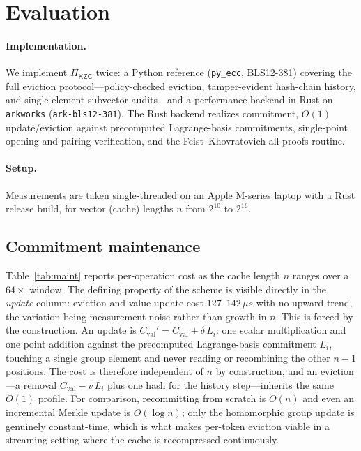 \documentclass[version=preprint]{iacrcc}
\theoremstyle{definition}
\newcommand{\Val}{\mathrm{val}}
\newcommand{\Cval}{C_{\Val}}
\begin{document}
\section{Evaluation}\label{sec:eval}

\paragraph{Implementation.}
We implement $\Pi_{\mathsf{KZG}}$ twice: a Python reference (\texttt{py\_ecc},
BLS12-381) covering the full eviction protocol---policy-checked eviction,
tamper-evident hash-chain history, and single-element subvector audits---and a
performance backend in Rust on \texttt{arkworks} (\texttt{ark-bls12-381}). The
Rust backend realizes commitment, $O(1)$ update/eviction against precomputed
Lagrange-basis commitments, single-point opening and pairing verification, and
the Feist--Khovratovich all-proofs routine.

\paragraph{Setup.}
Measurements are taken single-threaded on an Apple M-series laptop with a Rust
release build, for vector (cache) lengths $n$ from $2^{10}$ to $2^{16}$.

\subsection{Commitment maintenance}
Table~\ref{tab:maint} reports per-operation cost as the cache length $n$ ranges
over a $64\times$ window. The defining property of the scheme is visible directly
in the \emph{update} column: eviction and value update cost $127$--$142\,\mu s$
with no upward trend, the variation being measurement noise rather than growth in
$n$. This is forced by the construction. An update is
$\Cval'=\Cval\pm\delta\,L_i$: one scalar multiplication and one point addition
against the precomputed Lagrange-basis commitment $L_i$, touching a single group
element and never reading or recombining the other $n-1$ positions. The cost is
therefore independent of $n$ by construction, and an eviction---a removal
$\Cval-v\,L_i$ plus one hash for the history step---inherits the same $O(1)$
profile. For comparison, recommitting from scratch is $O(n)$ and even an
incremental Merkle update is $O(\log n)$; only the homomorphic group update is
genuinely constant-time, which is what makes per-token eviction viable in a
streaming setting where the cache is recompressed continuously.
\end{document}
